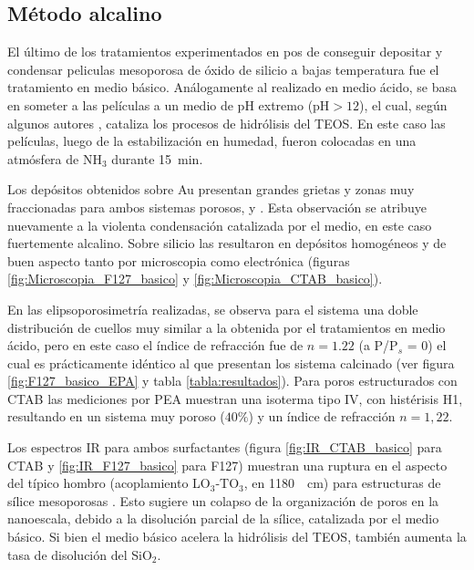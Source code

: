 	 \subsection{Método alcalino}

	 	 El último de los tratamientos experimentados en pos de conseguir depositar y condensar peliculas mesoporosa de óxido de silicio a bajas temperatura fue el tratamiento en medio básico. Análogamente al realizado en medio ácido, se basa en someter a las películas a un medio de pH extremo (pH$>12$), el cual, según algunos autores \cite{Soler-Illia2011,Huo1996,Ichinose2002,GonzalezSolveyra2017}, cataliza los procesos de hidrólisis del TEOS. En este caso las películas, luego de la estabilización en humedad, fueron colocadas en una atmósfera de NH$_3$ durante \SI{15}{\minute}. 

		 Los depósitos obtenidos sobre Au presentan grandes grietas y zonas muy fraccionadas para ambos sistemas porosos, \pdmF\space y \pdmC. Esta observación se atribuye nuevamente a la violenta condensación catalizada por el medio, en este caso fuertemente alcalino. Sobre silicio las \pdm\space resultaron en depósitos homogéneos y de buen aspecto tanto por microscopia como electrónica (figuras \ref{fig:Microscopia_F127_basico} y \ref{fig:Microscopia_CTAB_basico}).

		 En las elipsoporosimetría realizadas, se observa para el sistema \pdmF\space una doble distribución de cuellos muy similar a la obtenida por el tratamientos en medio ácido, pero en este caso el índice de refracción fue de $n=1.22$ (a P/P$_s$ = 0) el cual es prácticamente idéntico al que presentan los sistema calcinado (ver figura \ref{fig:F127_basico_EPA} y tabla \ref{tabla:resultados}). Para poros estructurados con CTAB las mediciones por PEA muestran una isoterma tipo IV, con histérisis H1, resultando en un sistema muy poroso ($40\%$) y un índice de refracción $n=1,22$.
	
		 Los espectros IR para ambos surfactantes (figura \ref{fig:IR_CTAB_basico} para CTAB y \ref{fig:IR_F127_basico} para F127) muestran una ruptura en el aspecto del típico hombro (acoplamiento LO$_3$-TO$_3$, en \SI{1180}{\per\cm}) para estructuras de sílice mesoporosas \cite{Olsen1989,Innocenzi2003,Angelome2008}. Esto sugiere un colapso de la organización de poros en la nanoescala, debido a la disolución parcial de la sílice, catalizada por el medio básico. Si bien el medio básico acelera la hidrólisis del TEOS, también aumenta la tasa de disolución del SiO$_2$.\cite{Mazer1994,Niibori2000,Gorrepati2010}


